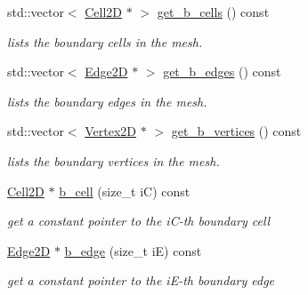 \begin{DoxyCompactItemize}
std\+::vector$<$ \hyperlink{classHArDCore2D_1_1Cell2D}{Cell2D} $\ast$ $>$ \hyperlink{group__Mesh2D_ga8fb293f0d674f0ea88b249e52ac59d1f}{get\+\_\+b\+\_\+cells} () const
\begin{DoxyCompactList}\small\item\em lists the boundary cells in the mesh. \end{DoxyCompactList}\item 
std\+::vector$<$ \hyperlink{classHArDCore2D_1_1Edge2D}{Edge2D} $\ast$ $>$ \hyperlink{group__Mesh2D_ga9cd5463239645bfce1a86d3d434777f7}{get\+\_\+b\+\_\+edges} () const
\begin{DoxyCompactList}\small\item\em lists the boundary edges in the mesh. \end{DoxyCompactList}\item 
std\+::vector$<$ \hyperlink{classHArDCore2D_1_1Vertex2D}{Vertex2D} $\ast$ $>$ \hyperlink{group__Mesh2D_ga2a92915e178d63480f93e3c452b91f24}{get\+\_\+b\+\_\+vertices} () const
\begin{DoxyCompactList}\small\item\em lists the boundary vertices in the mesh. \end{DoxyCompactList}\item 
\mbox{\label{classHArDCore2D_1_1Mesh2D_ac0bde8b9d9ddf8a4ef3d60e36efbdf61}} 
\hyperlink{classHArDCore2D_1_1Cell2D}{Cell2D} $\ast$ \hyperlink{classHArDCore2D_1_1Mesh2D_ac0bde8b9d9ddf8a4ef3d60e36efbdf61}{b\+\_\+cell} (size\+\_\+t iC) const
\begin{DoxyCompactList}\small\item\em get a constant pointer to the i\+C-\/th boundary cell \end{DoxyCompactList}\item 
\mbox{\label{classHArDCore2D_1_1Mesh2D_af8f54d47f1b75c185af7551e11c811f2}} 
\hyperlink{classHArDCore2D_1_1Edge2D}{Edge2D} $\ast$ \hyperlink{classHArDCore2D_1_1Mesh2D_af8f54d47f1b75c185af7551e11c811f2}{b\+\_\+edge} (size\+\_\+t iE) const
\begin{DoxyCompactList}\small\item\em get a constant pointer to the i\+E-\/th boundary edge \end{DoxyCompactList}\item 
\mbox{\label{classHArDCore2D_1_1Mesh2D_a843c1fa9dcbff99667a03d3f4d45bcb9}} 

\end{DoxyCompactItemize}
